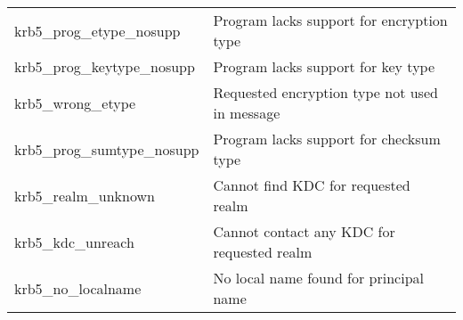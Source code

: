 \begin{small}
\begin{tabular}{ll}
{\sc krb5_prog_etype_nosupp }& Program lacks support for encryption type \\
{\sc krb5_prog_keytype_nosupp }& Program lacks support for key type \\
{\sc krb5_wrong_etype }&	 Requested encryption type not used in message \\
{\sc krb5_prog_sumtype_nosupp }& Program lacks support for checksum type \\
{\sc krb5_realm_unknown }&	 Cannot find KDC for requested realm \\
{\sc krb5_kdc_unreach }&	 Cannot contact any KDC for requested realm \\
{\sc krb5_no_localname }&	 No local name found for principal name \\

\end{tabular}


\end{small}
